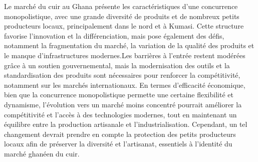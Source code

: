 \newpage
\chaptitle
\fancyhead[l]{}
\vspace{0.2cm}\vspace{0.4cm}
\hspace{0.5cm}

\newpage
\chaptitle
\fancyhead[l]{}
\vspace{0.2cm}\vspace{0.4cm}





\newpage 
\fancyhead[l]{}
\renewcommand{\thepage}{\MakeUppercase{\roman{page}}}
\setcounter{page}{5}
\newpage 
\vspace{0.2cm}\vspace{0.4cm}

Le marché du cuir au Ghana présente les caractéristiques d’une concurrence monopolistique, avec une grande diversité de produits et de nombreux petits producteurs locaux, principalement dans le nord et à Kumasi. Cette structure favorise l’innovation et la différenciation, mais pose également des défis, notamment la fragmentation du marché, la variation de la qualité des produits et le manque d’infrastructures modernes.Les barrières à l’entrée restent modérées grâce à un soutien gouvernemental, mais la modernisation des outils et la standardisation des produits sont nécessaires pour renforcer la compétitivité, notamment sur les marchés internationaux. En termes d'efficacité économique, bien que la concurrence monopolistique permette une certaine flexibilité et dynamisme, l'évolution vers un marché moins concentré pourrait améliorer la compétitivité et l'accès à des technologies modernes, tout en maintenant un équilibre entre la production artisanale et l'industrialisation. Cependant, un tel changement devrait prendre en compte la protection des petits producteurs locaux afin de préserver la diversité et l’artisanat, essentiels à l'identité du marché ghanéen du cuir.

\newpage


